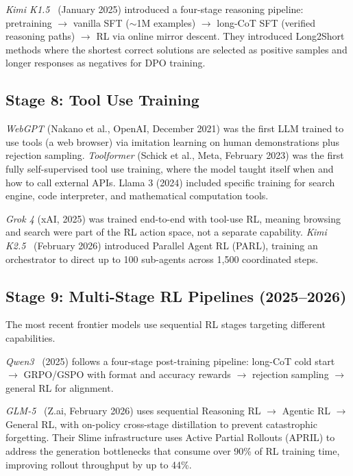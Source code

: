 \documentclass[12pt]{article}
\begin{document}
\textit{Kimi K1.5}~\cite{Kimi2025K15} (January 2025) introduced a four-stage reasoning pipeline: pretraining $\rightarrow$ vanilla SFT ($\sim$1M examples) $\rightarrow$ long-CoT SFT (verified reasoning paths) $\rightarrow$ RL via online mirror descent. They introduced Long2Short methods where the shortest correct solutions are selected as positive samples and longer responses as negatives for DPO training.

\subsection{Stage 8: Tool Use Training}

\textit{WebGPT} (Nakano et al., OpenAI, December 2021) was the first LLM trained to use tools (a web browser) via imitation learning on human demonstrations plus rejection sampling. \textit{Toolformer} (Schick et al., Meta, February 2023) was the first fully self-supervised tool use training, where the model taught itself when and how to call external APIs. Llama 3 (2024) included specific training for search engine, code interpreter, and mathematical computation tools.

\textit{Grok 4} (xAI, 2025) was trained end-to-end with tool-use RL, meaning browsing and search were part of the RL action space, not a separate capability. \textit{Kimi K2.5}~\cite{Kimi2025Researcher} (February 2026) introduced Parallel Agent RL (PARL), training an orchestrator to direct up to 100 sub-agents across 1,500 coordinated steps.

\subsection{Stage 9: Multi-Stage RL Pipelines (2025--2026)}

The most recent frontier models use sequential RL stages targeting different capabilities.

\textit{Qwen3}~\cite{Qwen2025Qwen3} (2025) follows a four-stage post-training pipeline: long-CoT cold start $\rightarrow$ GRPO/GSPO with format and accuracy rewards $\rightarrow$ rejection sampling $\rightarrow$ general RL for alignment.

\textit{GLM-5}~\cite{GLM2025GLM5} (Z.ai, February 2026) uses sequential Reasoning RL $\rightarrow$ Agentic RL $\rightarrow$ General RL, with on-policy cross-stage distillation to prevent catastrophic forgetting. Their Slime infrastructure uses Active Partial Rollouts (APRIL) to address the generation bottlenecks that consume over 90\% of RL training time, improving rollout throughput by up to 44\%.
\end{document}
